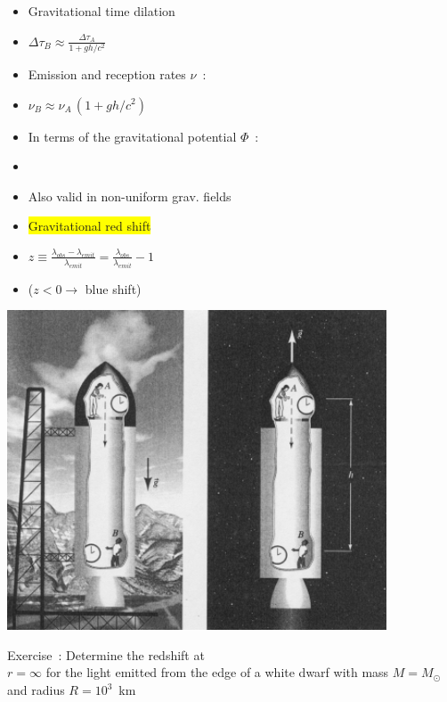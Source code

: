 \Tr
{}%
\begin{itemize}
\item {\blue Gravitational time dilation}
\item[] $\displaystyle \Delta\tau_{B} \approx \frac{\Delta\tau_{A}}{1+gh/c^{2}}$
\item[] {\blue Emission and reception rates $\nu$}~: 
\item[] $\nu_{B} \approx \nu_{A}\,(1+gh/c^{2})$
\item In terms of the {\blue gravitational potential $\Phi$}~:
\item[] {\red {}}
\item[] Also valid in non-uniform grav. fields
\item[] \begin{center}\colorbox{yellow}{Gravitational red shift}\end{center}
\item[] {\blue $\displaystyle z \equiv \frac{\lambda_{obs}-\lambda_{emit}}{\lambda_{emit}}
         =\frac{\lambda_{obs}}{\lambda_{emit}}-1$}
\item[] ($z<0 \rightarrow$ blue shift)
\end{itemize}

\newpage
%
\begin{center}
\includegraphics[keepaspectratio,height=9.5cm]{clocks2}
\end{center}
%
\begin{itemize}
{\red
\item[$\ast$] Exercise~: Determine the redshift at\\
              $r=\infty$ for the light emitted from the edge 
              of a white dwarf with mass $M=M_{\odot}$ and radius $R=10^{3}$~km
}
\end{itemize}

